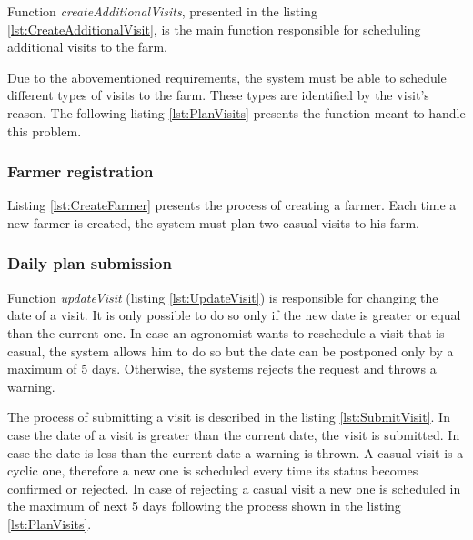 Function \textit{createAdditionalVisits}, presented in the listing \ref{lst:CreateAdditionalVisit}, is the main function responsible for scheduling additional visits to the farm.



Due to the abovementioned requirements, the system must be able to schedule different types of visits to the farm. These types are identified by the visit's reason. The following listing \ref{lst:PlanVisits} presents the function meant to handle this problem.



\subsubsection*{Farmer registration}

Listing \ref{lst:CreateFarmer} presents the process of creating a farmer. Each time a new farmer is created, the system must plan two casual visits to his farm.



\subsubsection*{Daily plan submission}

Function \textit{updateVisit} (listing \ref{lst:UpdateVisit}) is responsible for changing the date of a visit. It is only possible to do so only if the new date is greater or equal than the current one. In case an agronomist wants to reschedule a visit that is casual, the system allows him to do so but the date can be postponed only by a maximum of 5 days. Otherwise, the systems rejects the request and throws a warning.



The process of submitting a visit is described in the listing \ref{lst:SubmitVisit}. In case the date of a visit is greater than the current date, the visit is submitted. In case the date is less than the current date a warning is thrown. A casual visit is a cyclic one, therefore a new one is scheduled every time its status becomes confirmed or rejected. In case of rejecting a casual visit a new one is scheduled in the maximum of next 5 days following the process shown in the listing \ref{lst:PlanVisits}.

